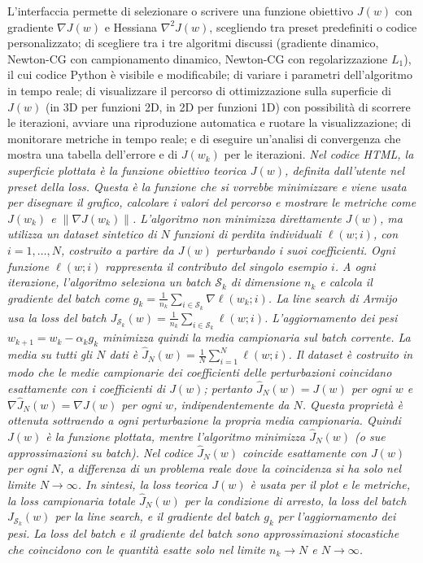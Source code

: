 \documentclass[a4paper,12pt]{article}
\begin{document}
L'interfaccia permette di selezionare o scrivere una funzione obiettivo $J(w)$ con gradiente $\nabla J(w)$ e Hessiana $\nabla^2 J(w)$, scegliendo tra preset predefiniti o codice personalizzato; di scegliere tra i tre algoritmi discussi (gradiente dinamico, Newton-CG con campionamento dinamico, Newton-CG con regolarizzazione $L_1$), il cui codice Python è visibile e modificabile; di variare i parametri dell'algoritmo in tempo reale; di visualizzare il percorso di ottimizzazione sulla superficie di $J(w)$ (in 3D per funzioni 2D, in 2D per funzioni 1D) con possibilità di scorrere le iterazioni, avviare una riproduzione automatica e ruotare la visualizzazione; di monitorare metriche in tempo reale; e di eseguire un'analisi di convergenza che mostra una tabella dell'errore e di $J(w_k)$ per le iterazioni.
\textit{Nel codice HTML, la superficie plottata è la funzione obiettivo teorica $J(w)$, definita dall'utente nel preset della loss. Questa è la funzione che si vorrebbe minimizzare e viene usata per disegnare il grafico, calcolare i valori del percorso e mostrare le metriche come $J(w_k)$ e $\|\nabla J(w_k)\|$. L'algoritmo non minimizza direttamente $J(w)$, ma utilizza un dataset sintetico di $N$ funzioni di perdita individuali $\ell(w; i)$, con $i = 1,\dots,N$, costruito a partire da $J(w)$ perturbando i suoi coefficienti. Ogni funzione $\ell(w; i)$ rappresenta il contributo del singolo esempio $i$. A ogni iterazione, l'algoritmo seleziona un batch $\mathcal{S}_k$ di dimensione $n_k$ e calcola il gradiente del batch come $g_k = \frac{1}{n_k} \sum_{i \in \mathcal{S}_k} \nabla \ell(w_k; i)$. La line search di Armijo usa la loss del batch $J_{\mathcal{S}_k}(w) = \frac{1}{n_k} \sum_{i \in \mathcal{S}_k} \ell(w; i)$. L'aggiornamento dei pesi $w_{k+1} = w_k - \alpha_k g_k$ minimizza quindi la media campionaria sul batch corrente. La media su tutti gli $N$ dati è $\hat J_N(w) = \frac{1}{N} \sum_{i=1}^N \ell(w; i)$. Il dataset è costruito in modo che le medie campionarie dei coefficienti delle perturbazioni coincidano esattamente con i coefficienti di $J(w)$; pertanto $\hat J_N(w) = J(w)$ per ogni $w$ e $\nabla \hat J_N(w) = \nabla J(w)$ per ogni $w$, indipendentemente da $N$. Questa proprietà è ottenuta sottraendo a ogni perturbazione la propria media campionaria. Quindi $J(w)$ è la funzione plottata, mentre l'algoritmo minimizza $\hat J_N(w)$ (o sue approssimazioni su batch). Nel codice $\hat J_N(w)$ coincide esattamente con $J(w)$ per ogni $N$, a differenza di un problema reale dove la coincidenza si ha solo nel limite $N \to \infty$. In sintesi, la loss teorica $J(w)$ è usata per il plot e le metriche, la loss campionaria totale $\hat J_N(w)$ per la condizione di arresto, la loss del batch $J_{\mathcal{S}_k}(w)$ per la line search, e il gradiente del batch $g_k$ per l'aggiornamento dei pesi. La loss del batch e il gradiente del batch sono approssimazioni stocastiche che coincidono con le quantità esatte solo nel limite $n_k \to N$ e $N \to \infty$.}
\end{document}
